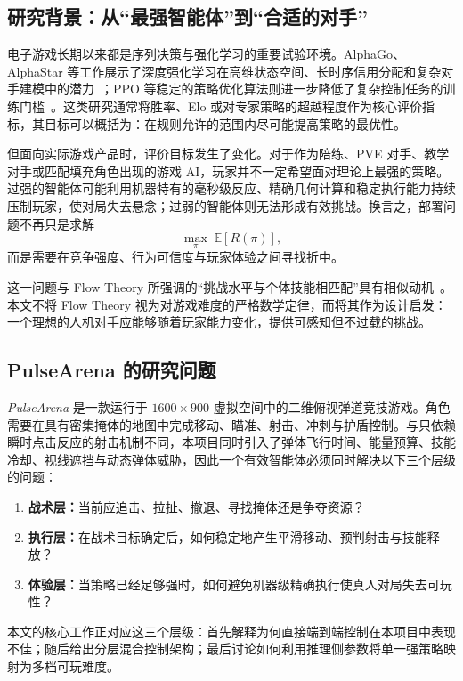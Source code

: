\documentclass[UTF8,a4paper,11pt]{ctexart}
\begin{document}
\subsection{研究背景：从“最强智能体”到“合适的对手”}
电子游戏长期以来都是序列决策与强化学习的重要试验环境。AlphaGo、AlphaStar 等工作展示了深度强化学习在高维状态空间、长时序信用分配和复杂对手建模中的潜力~\cite{silver2016alphago,vinyals2019alphastar}；PPO 等稳定的策略优化算法则进一步降低了复杂控制任务的训练门槛~\cite{schulman2017ppo}。这类研究通常将胜率、Elo 或对专家策略的超越程度作为核心评价指标，其目标可以概括为：在规则允许的范围内尽可能提高策略的最优性。

但面向实际游戏产品时，评价目标发生了变化。对于作为陪练、PVE 对手、教学对手或匹配填充角色出现的游戏 AI，玩家并不一定希望面对理论上最强的策略。过强的智能体可能利用机器特有的毫秒级反应、精确几何计算和稳定执行能力持续压制玩家，使对局失去悬念；过弱的智能体则无法形成有效挑战。换言之，部署问题不再只是求解
\[
\max_\pi \; \mathbb{E}[R(\pi)],
\]
而是需要在竞争强度、行为可信度与玩家体验之间寻找折中。

这一问题与 Flow Theory 所强调的“挑战水平与个体技能相匹配”具有相似动机~\cite{csikszentmihalyi1990flow}。本文不将 Flow Theory 视为对游戏难度的严格数学定律，而将其作为设计启发：一个理想的人机对手应能够随着玩家能力变化，提供可感知但不过载的挑战。

\subsection{PulseArena 的研究问题}
\textit{PulseArena} 是一款运行于 $1600\times900$ 虚拟空间中的二维俯视弹道竞技游戏。角色需要在具有密集掩体的地图中完成移动、瞄准、射击、冲刺与护盾控制。与只依赖瞬时点击反应的射击机制不同，本项目同时引入了弹体飞行时间、能量预算、技能冷却、视线遮挡与动态弹体威胁，因此一个有效智能体必须同时解决以下三个层级的问题：

\begin{enumerate}
    \item \textbf{战术层：}当前应追击、拉扯、撤退、寻找掩体还是争夺资源？
    \item \textbf{执行层：}在战术目标确定后，如何稳定地产生平滑移动、预判射击与技能释放？
    \item \textbf{体验层：}当策略已经足够强时，如何避免机器级精确执行使真人对局失去可玩性？
\end{enumerate}

本文的核心工作正对应这三个层级：首先解释为何直接端到端控制在本项目中表现不佳；随后给出分层混合控制架构；最后讨论如何利用推理侧参数将单一强策略映射为多档可玩难度。
\end{document}
